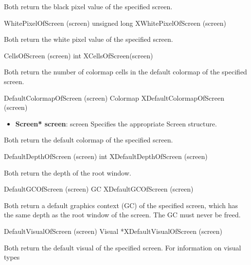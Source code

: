 \documentclass{report}
\begin{document}
\begin{itemize}
            \bigbreak \noindent 
            Both return the black pixel value of the specified screen.
            \bigbreak \noindent 
            \begin{cppcode}
                WhitePixelOfScreen (screen)
                unsigned long XWhitePixelOfScreen (screen)
            \end{cppcode}
            \bigbreak \noindent 
            Both return the white pixel value of the specified screen.
            \bigbreak \noindent 
            \begin{cppcode}
                CellsOfScreen (screen)
                int XCellsOfScreen(screen)
            \end{cppcode}
            \bigbreak \noindent 
            Both return the number of colormap cells in the default colormap of the specified screen.
            \bigbreak \noindent 
            \begin{cppcode}
                DefaultColormapOfScreen (screen)
                Colormap XDefaultColormapOfScreen (screen)
            \end{cppcode}
            \begin{itemize}
                \item \textbf{Screen* screen}: screen Specifies the appropriate Screen structure.
            \end{itemize}
            Both return the default colormap of the specified screen.
            \bigbreak \noindent 
            \begin{cppcode}
                DefaultDepthOfScreen (screen)
                int XDefaultDepthOfScreen (screen)
            \end{cppcode}
            \bigbreak \noindent 
            Both return the depth of the root window.
            \bigbreak \noindent 
            \begin{cppcode}
                DefaultGCOfScreen (screen)
                GC XDefaultGCOfScreen (screen)
            \end{cppcode}
            \bigbreak \noindent 
            Both return a default graphics context (GC) of the specified screen, which has the same depth as the root window of the screen. The GC must never be freed.
            \bigbreak \noindent 
            \begin{cppcode}
                DefaultVisualOfScreen (screen)
                Visual *XDefaultVisualOfScreen (screen)
            \end{cppcode}
            \bigbreak \noindent 
            Both return the default visual of the specified screen. For information on visual types

\end{itemize}
\end{document}
